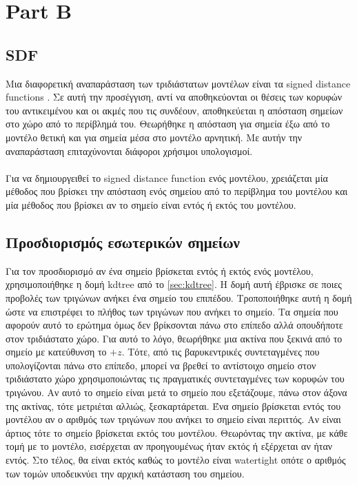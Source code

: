 \documentclass{report}
\begin{document}
\chapter{Part B}


\section{SDF}
Μια διαφορετική αναπαράσταση των τριδιάστατων μοντέλων είναι τα signed distance functions \cite{signed-distance-function}.
Σε αυτή την προσέγγιση, αντί να αποθηκεύονται οι θέσεις των κορυφών του αντικειμένου και οι ακμές που τις συνδέουν, 
αποθηκεύεται η απόσταση σημείων στο χώρο από το περίβλημά του. Θεωρήθηκε η απόσταση για σημεία έξω από το μοντέλο θετική
και για σημεία μέσα στο μοντέλο αρνητική. Με αυτήν την αναπαράσταση επιταχύνονται διάφοροι χρήσιμοι υπολογισμοί.
\\\\
Για να δημιουργειθεί το signed distance function ενός μοντέλου, χρειάζεται μία μέθοδος που βρίσκει την απόσταση
ενός σημείου από το περίβλημα του μοντέλου και μία μέθοδος που βρίσκει αν το σημείο είναι εντός ή εκτός του μοντέλου.


\section{Προσδιορισμός εσωτερικών σημείων}
Για τον προσδιορισμό αν ένα σημείο βρίσκεται εντός ή εκτός ενός μοντέλου, χρησιμοποιήθηκε η δομή kdtree από το \ref{sec:kdtree}.
Η δομή αυτή έβρισκε σε ποιες προβολές των τριγώνων ανήκει ένα σημείο του επιπέδου. Τροποποιήθηκε αυτή η δομή
ώστε να επιστρέφει το πλήθος των τριγώνων που ανήκει το σημείο. Τα σημεία που αφορούν αυτό το ερώτημα όμως δεν βρίκσονται πάνω
στο επίπεδο αλλά οπουδήποτε στον τριδιάστατο χώρο. Για αυτό το λόγο, θεωρήθηκε μια ακτίνα που ξεκινά από το σημείο με
κατεύθυνση το $+z$. Τότε, από τις βαρυκεντρικές συντεταγμένες που υπολογίζονται πάνω στο επίπεδο, μπορεί να βρεθεί το
αντίστοιχο σημείο στον τριδιάστατο χώρο χρησιμοποιώντας τις πραγματικές συντεταγμένες των κορυφών του τριγώνου.
Αν αυτό το σημείο είναι μετά το σημείο που εξετάζουμε, πάνω στον άξονα της ακτίνας, τότε μετριέται αλλιώς, ξεσκαρτάρεται.
Ένα σημείο βρίσκεται εντός του μοντέλου αν ο αριθμός των τριγώνων που ανήκει το σημείο είναι περιττός. Αν είναι άρτιος
τότε το σημείο βρίσκεται εκτός του μοντέλου. Θεωρόντας την ακτίνα, με κάθε τομή με το μοντέλο, εισέρχεται αν προηγουμένως
ήταν εκτός ή εξέρχεται αν ήταν εντός. Στο τέλος, θα είναι εκτός καθώς το μοντέλο είναι watertight οπότε ο αριθμός των τομών
υποδεικνύει την αρχική κατάσταση του σημείου.
\end{document}
